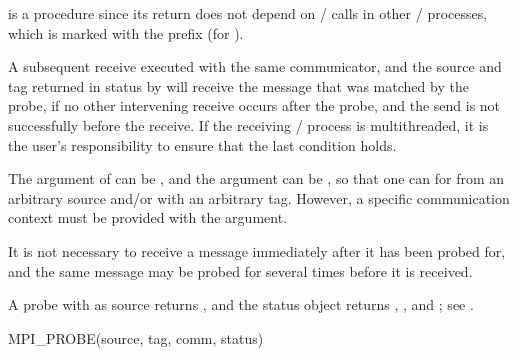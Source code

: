  is a  procedure since its return does not depend
on \MPI/ calls in other \MPI/ processes, which is marked with the prefix  (for ).

A subsequent receive executed with the same communicator, and the source and
tag returned in status by  will receive the message that
was matched by the probe, if no other intervening receive occurs after the
probe, and the send is not successfully  before the receive.
If the receiving \MPI/ process is multithreaded, it is the user's
responsibility to ensure that the last condition holds.

The  argument of  can be
, and the  argument can be
, so that one can  for  from an arbitrary
source and/or with
an arbitrary tag.  However, a specific communication context
must be provided with the  argument.

It is not necessary to receive a message immediately after it has been
probed for, and the
same message may be probed for several times before it is received.

A probe with  as source returns , and the status object returns \mpicode{ = },
\mpicode{ = }, and ;
see .

\begin{funcdef}{MPI\_PROBE}{(\mbox{source}, \mbox{tag}, \mbox{comm}, \mbox{status})}
\end{funcdef}

